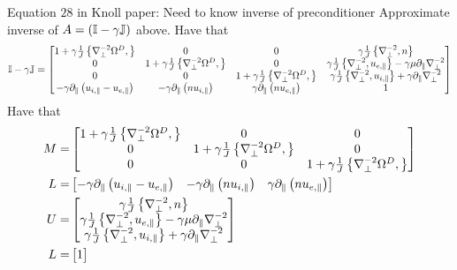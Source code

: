 Equation $28$ in Knoll paper: Need to know inverse of preconditioner
Approximate inverse of $A=\left( \mathbb{I} - \gamma\mathbb{J}\right)$ above.
Have that
%
\begin{align*}
\mathbb{I} - \gamma\mathbb{J} =
    \begin{bmatrix}
        1+\gamma\frac{1}{J}\left\{\nabla_\perp^{-2}\Omega^D,\right\}
        & 0
        & 0
        & \gamma\frac{1}{J}\left\{\nabla_\perp^{-2},n\right\}
        \\
        0
        &1+ \gamma\frac{1}{J}\left\{\nabla_\perp^{-2}\Omega^D,\right\}
        & 0
        & \gamma\frac{1}{J}\left\{\nabla_\perp^{-2},u_{e,\|}\right\}
          -\gamma\mu \partial_\| \nabla_\perp^{-2}
        \\
        0
        & 0
        & 1+\gamma\frac{1}{J}\left\{\nabla_\perp^{-2}\Omega^D,\right\}
        & \gamma\frac{1}{J}\left\{\nabla_\perp^{-2},u_{i,\|}\right\}
        + \gamma\partial_\|\nabla_\perp^{-2}
        \\
        -\gamma\partial_\| \left(u_{i,\|} - u_{e,\|} \right)
        & -\gamma\partial_\| \left(nu_{i,\|} \right)
        & \gamma\partial_\| \left(nu_{e,\|} \right)
        & 1
    \end{bmatrix}
\end{align*}
%
Have that
%
\begin{align*}
    M =&
    \begin{bmatrix}
        1+\gamma\frac{1}{J}\left\{\nabla_\perp^{-2}\Omega^D,\right\}
        & 0
        & 0
        \\
        0
        &1+ \gamma\frac{1}{J}\left\{\nabla_\perp^{-2}\Omega^D,\right\}
        & 0
        \\
        0
        & 0
        & 1+\gamma\frac{1}{J}\left\{\nabla_\perp^{-2}\Omega^D,\right\}
    \end{bmatrix}
    \\
    L = &
    \begin{bmatrix}
        -\gamma\partial_\| \left(u_{i,\|} - u_{e,\|} \right)
        & -\gamma\partial_\| \left(nu_{i,\|} \right)
        & \gamma\partial_\| \left(nu_{e,\|} \right)
    \end{bmatrix}
    \\
    U =&
    \begin{bmatrix}
        \gamma\frac{1}{J}\left\{\nabla_\perp^{-2},n\right\}
        \\
        \gamma\frac{1}{J}\left\{\nabla_\perp^{-2},u_{e,\|}\right\}
          -\gamma\mu \partial_\| \nabla_\perp^{-2}
        \\
        \gamma\frac{1}{J}\left\{\nabla_\perp^{-2},u_{i,\|}\right\}
        + \gamma\partial_\|\nabla_\perp^{-2}
    \end{bmatrix}
    \\
    L = &
    \begin{bmatrix}
        1
    \end{bmatrix}
\end{align*}
